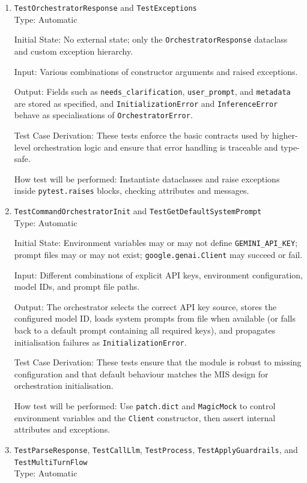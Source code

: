 \documentclass[12pt, titlepage]{article}
\begin{document}
\begin{enumerate}
\item{\texttt{TestOrchestratorResponse} and \texttt{TestExceptions}\\}
Type: Automatic

Initial State: No external state; only the \texttt{OrchestratorResponse} dataclass and custom exception hierarchy.

Input: Various combinations of constructor arguments and raised exceptions.

Output: Fields such as \texttt{needs\_clarification}, \texttt{user\_prompt}, and \texttt{metadata} are stored as specified, and \texttt{InitializationError} and \texttt{InferenceError} behave as specialisations of \texttt{OrchestratorError}.

Test Case Derivation: These tests enforce the basic contracts used by higher-level orchestration logic and ensure that error handling is traceable and type-safe.

How test will be performed: Instantiate dataclasses and raise exceptions inside \texttt{pytest.raises} blocks, checking attributes and messages.

\item{\texttt{TestCommandOrchestratorInit} and \texttt{TestGetDefaultSystemPrompt}\\}
Type: Automatic

Initial State: Environment variables may or may not define \texttt{GEMINI\_API\_KEY}; prompt files may or may not exist; \texttt{google.genai.Client} may succeed or fail.

Input: Different combinations of explicit API keys, environment configuration, model IDs, and prompt file paths.

Output: The orchestrator selects the correct API key source, stores the configured model ID, loads system prompts from file when available (or falls back to a default prompt containing all required keys), and propagates initialisation failures as \texttt{InitializationError}.

Test Case Derivation: These tests ensure that the module is robust to missing configuration and that default behaviour matches the MIS design for orchestration initialisation.

How test will be performed: Use \texttt{patch.dict} and \texttt{MagicMock} to control environment variables and the \texttt{Client} constructor, then assert internal attributes and exceptions.

\item{\texttt{TestParseResponse}, \texttt{TestCallLlm}, \texttt{TestProcess}, \texttt{TestApplyGuardrails}, and \texttt{TestMultiTurnFlow}\\}
Type: Automatic


\end{enumerate}
\end{document}
